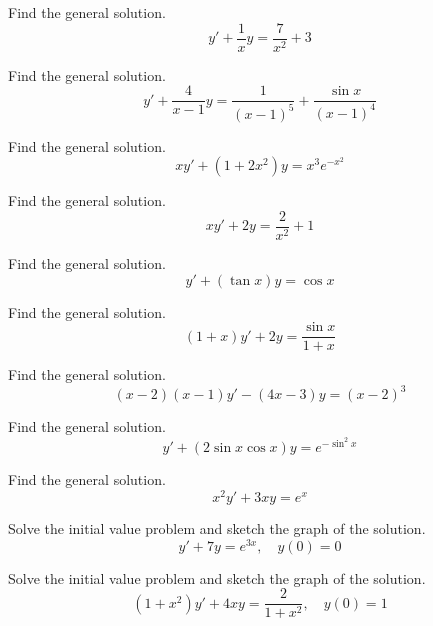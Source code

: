 \documentclass{ximera}
\begin{document}
\begin{problem}\label{exer:2.1.16} Find the general solution.
$$y'+\frac{1}{x}y=\frac{7}{x^2}+3$$
\end{problem}


\begin{problem}\label{exer:2.1.17} Find the general solution.
$$y'+\frac{4}{x-1}y= \frac{1}{(x-1)^5}+\frac{\sin x}{(x-1)^4}$$
\end{problem}

\begin{problem}\label{exer:2.1.18} Find the general solution.
$$xy'+(1+2x^2)y=x^3e^{-x^2}$$
\end{problem}

\begin{problem}\label{exer:2.1.19} Find the general solution.
$$xy'+2y=\frac{2}{x^2}+1$$
\end{problem}

\begin{problem}\label{exer:2.1.20} Find the general solution.
$$y'+(\tan x)y=\cos x$$
\end{problem}

\begin{problem}\label{exer:2.1.21} Find the general solution.
$$(1+x)y'+2y=\frac{\sin x}{1 + x}$$
\end{problem}

\begin{problem}\label{exer:2.1.22} Find the general solution.
$$(x-2)(x-1)y'-(4x-3)y=(x-2)^3$$
\end{problem}

\begin{problem}\label{exer:2.1.23} Find the general solution.
$$y'+(2\sin x\cos x) y=e^{-\sin^2x}$$
\end{problem}

\begin{problem}\label{exer:2.1.24} Find the general solution.
$$x^2y'+3xy=e^x$$
\end{problem}

\begin{problem}\label{exer:2.1.25} Solve the
initial value problem and sketch the graph of the solution.
$$y'+7y=e^{3x},\quad y(0)=0$$
\end{problem}

\begin{problem}\label{exer:2.1.26} Solve the
initial value problem and sketch the graph of the solution.
$$(1+x^2)y'+4xy=\frac{2}{1+x^2},\quad y(0)=1$$
\end{problem}
\end{document}
